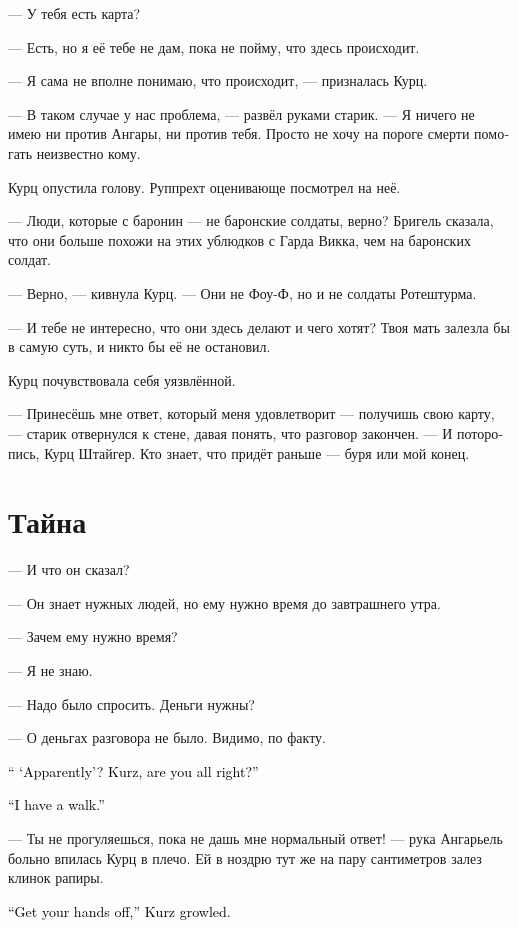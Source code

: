 \documentclass[a4paper,12pt,fleqn]{book}\usepackage{cooltooltips}\usepackage{polyglossia}\setdefaultlanguage[babelshorthands=true]{russian}\setotherlanguage{english}\defaultfontfeatures{Ligatures=TeX,Mapping=tex-text} \usepackage{xcolor}\definecolor{lightgray}{HTML}{bbbbbb}\color{lightgray}\newcommand{\ml}[3]{\textenglish{\textcolor{black}{#3}}}
\begin{document}
--- У тебя есть карта?

--- Есть, но я её тебе не дам, пока не пойму, что здесь происходит.

--- Я сама не вполне понимаю, что происходит, --- призналась Курц.

--- В таком случае у нас проблема, --- развёл руками старик.
--- Я ничего не имею ни против Ангары, ни против тебя.
Просто не хочу на пороге смерти помогать неизвестно кому.

Курц опустила голову.
Руппрехт оценивающе посмотрел на неё.

--- Люди, которые с баронин --- не баронские солдаты, верно?
Бригель сказала, что они больше похожи на этих ублюдков с Гарда Викка, чем на баронских солдат.

--- Верно, --- кивнула Курц.
--- Они не Фоу-Ф, но и не солдаты Ротештурма.

--- И тебе не интересно, что они здесь делают и чего хотят?
Твоя мать залезла бы в самую суть, и никто бы её не остановил.

Курц почувствовала себя уязвлённой.

--- Принесёшь мне ответ, который меня удовлетворит --- получишь свою карту, --- старик отвернулся к стене, давая понять, что разговор закончен.
--- И поторопись, Курц Штайгер.
Кто знает, что придёт раньше --- буря или мой конец.

\section{Тайна}

--- И что он сказал?

--- Он знает нужных людей, но ему нужно время до завтрашнего утра.

--- Зачем ему нужно время?

--- Я не знаю.

--- Надо было спросить.
Деньги нужны?

--- О деньгах разговора не было.
Видимо, по факту.

\ml{$0$}
{--- <<Видимо>>?}
{`` `Apparently'?}
\ml{$0$}
{Курц, с тобой всё в порядке?}
{Kurz, are you all right?''}

\ml{$0$}
{--- Я прогуляюсь.}
{``I have a walk.''}

--- Ты не прогуляешься, пока не дашь мне нормальный ответ! --- рука Ангарьель больно впилась Курц в плечо.
Ей в ноздрю тут же на пару сантиметров залез клинок рапиры.

\ml{$0$}
{--- Убери руки, --- прорычала Курц.}
{``Get your hands off,'' Kurz growled.}
\end{document}
